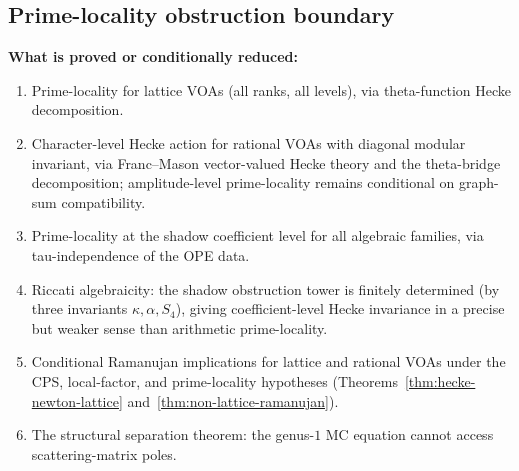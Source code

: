 \subsection{Prime-locality obstruction boundary}

\begin{remark}%
\label{rem:prime-locality-definitive}%
\mbox{}

\textbf{What is proved or conditionally reduced:}
\begin{enumerate}[label=\textup{(\arabic*)}]
\item Prime-locality for lattice VOAs \textup{(}all ranks,
 all levels\textup{)}, via theta-function Hecke decomposition.
\item Character-level Hecke action for rational VOAs with diagonal
 modular invariant, via Franc--Mason vector-valued Hecke theory and
 the theta-bridge decomposition; amplitude-level prime-locality
 remains conditional on graph-sum compatibility.
\item Prime-locality at the shadow coefficient level for all
 algebraic families, via tau-independence of the OPE data.
\item Riccati algebraicity: the shadow obstruction tower is finitely
 determined \textup{(}by three invariants $\kappa, \alpha, S_4$\textup{)},
giving coefficient-level Hecke invariance in a precise but weaker
sense than arithmetic prime-locality.
\item Conditional Ramanujan implications for lattice and rational VOAs
 under the CPS, local-factor, and prime-locality hypotheses
 \textup{(}Theorems~\textup{\ref{thm:hecke-newton-lattice}}
 and~\textup{\ref{thm:non-lattice-ramanujan}}\textup{)}.
\item The structural separation theorem: the genus-$1$ MC
 equation cannot access scattering-matrix poles.
\end{enumerate}


\end{remark}
